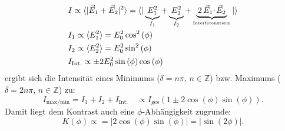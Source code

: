 \begin{align*}
	&	I 					 	\propto	 \langle |\vec{E}_{1} + \vec{E}_{2}|^2 \rangle = \langle |\underbrace{ \, E_{1}^2 \, }_{\substack{I_1}} + \underbrace{ \, E_{2}^2 \, }_{\substack{I_2}} + \underbrace{ \, 2 \, \vec{E}_{1} \! \cdot \! \vec{E}_{2} \, }_{\substack{\text{\tiny{Interferenzterm}}}} |\rangle \\
  	&	I_{1} 	\propto	 \langle E_1^2 \rangle = E_0^2  \cos^2{(\phi)}\\ %
	&	I_2 	\propto	 \langle E_2^2 \rangle = E_0^2  \sin^2{(\phi)} \\
	&	I_{\text{Int.}}	\propto	 \pm 2 E_0^2  \sin{(\phi)} \cos{(\phi)}\\
\end{align*}
ergibt sich die Intensität eines Minimums ($\delta = n \pi$, $n \in \mathbb{Z}$) bzw. Maximums ($\delta=2n\pi$, $n \in \mathbb{Z}$) zu:
\begin{equation*}
	I_{\text{max/min}} 	= I_1+I_2+I_{\text{Int.}} \quad \propto I_{\text{ges}} \left(1 \pm 2 \cos{(\phi)} \sin{(\phi)}\right).
	\label{eqn:intensity}
\end{equation*}
Damit liegt dem Kontrast auch eine $\phi$-Abhängigkeit zugrunde:
\begin{equation}
	K(\phi) \propto = | 2 \cos{(\phi)} \sin{(\phi)} | = |\sin{(2\phi)}|. %
	\label{eqn:kontrastmitwinkel}
\end{equation}

